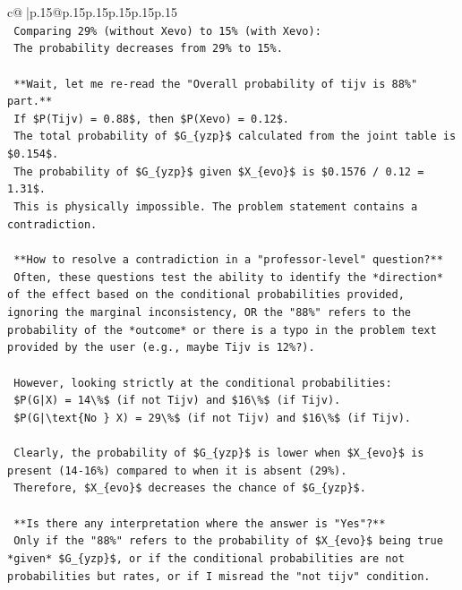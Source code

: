 \documentclass{article}
\begin{document}
{\begin{supertabular}{c@{$\;$}|p{.15\linewidth}@{}p{.15\linewidth}p{.15\linewidth}p{.15\linewidth}p{.15\linewidth}p{.15\linewidth}}
{{{\\ 
\texttt{    Comparing 29\% (without Xevo) to 15\% (with Xevo):} \\
\texttt{    The probability decreases from 29\% to 15\%.} \\
\\ 
\texttt{    **Wait, let me re{-}read the "Overall probability of tijv is 88\%" part.**} \\
\texttt{    If \$P(Tijv) = 0.88\$, then \$P(Xevo) = 0.12\$.} \\
\texttt{    The total probability of \$G\_\{yzp\}\$ calculated from the joint table is \$0.154\$.} \\
\texttt{    The probability of \$G\_\{yzp\}\$ given \$X\_\{evo\}\$ is \$0.1576 / 0.12 = 1.31\$.} \\
\texttt{    This is physically impossible. The problem statement contains a contradiction.} \\
\\ 
\texttt{    **How to resolve a contradiction in a "professor{-}level" question?**} \\
\texttt{    Often, these questions test the ability to identify the *direction* of the effect based on the conditional probabilities provided, ignoring the marginal inconsistency, OR the "88\%" refers to the probability of the *outcome* or there is a typo in the problem text provided by the user (e.g., maybe Tijv is 12\%?).} \\
\\ 
\texttt{    However, looking strictly at the conditional probabilities:} \\
\texttt{    \$P(G|X) = 14\textbackslash{}\%\$ (if not Tijv) and \$16\textbackslash{}\%\$ (if Tijv).} \\
\texttt{    \$P(G|\textbackslash{}text\{No \} X) = 29\textbackslash{}\%\$ (if not Tijv) and \$16\textbackslash{}\%\$ (if Tijv).} \\
\\ 
\texttt{    Clearly, the probability of \$G\_\{yzp\}\$ is lower when \$X\_\{evo\}\$ is present (14{-}16\%) compared to when it is absent (29\%).} \\
\texttt{    Therefore, \$X\_\{evo\}\$ decreases the chance of \$G\_\{yzp\}\$.} \\
\\ 
\texttt{    **Is there any interpretation where the answer is "Yes"?**} \\
\texttt{    Only if the "88\%" refers to the probability of \$X\_\{evo\}\$ being true *given* \$G\_\{yzp\}\$, or if the conditional probabilities are not probabilities but rates, or if I misread the "not tijv" condition.} \\
}}}
\end{supertabular}}
\end{document}
